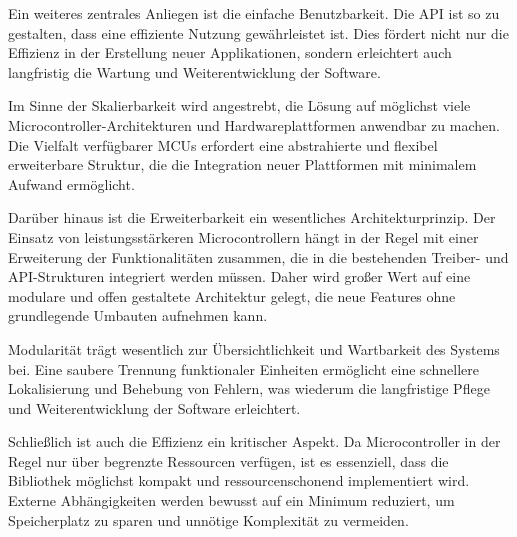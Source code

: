 Ein weiteres zentrales Anliegen ist die einfache Benutzbarkeit. 
Die API ist so zu gestalten, dass eine effiziente Nutzung gewährleistet ist. 
Dies fördert nicht nur die Effizienz in der Erstellung neuer Applikationen, sondern erleichtert auch langfristig die Wartung und Weiterentwicklung der Software.

Im Sinne der Skalierbarkeit wird angestrebt, die Lösung auf möglichst viele Microcontroller-Architekturen und Hardwareplattformen anwendbar zu machen.
Die Vielfalt verfügbarer MCUs erfordert eine abstrahierte und flexibel erweiterbare Struktur, die die Integration neuer Plattformen mit minimalem Aufwand ermöglicht.


Darüber hinaus ist die Erweiterbarkeit ein wesentliches Architekturprinzip.
Der Einsatz von leistungsstärkeren Microcontrollern hängt in der Regel mit einer Erweiterung der Funktionalitäten zusammen, die in die bestehenden Treiber- und API-Strukturen integriert werden müssen.
Daher wird großer Wert auf eine modulare und offen gestaltete Architektur gelegt, die neue Features ohne grundlegende Umbauten aufnehmen kann.

Modularität trägt wesentlich zur Übersichtlichkeit und Wartbarkeit des Systems bei. 
Eine saubere Trennung funktionaler Einheiten ermöglicht eine schnellere Lokalisierung und Behebung von Fehlern, was wiederum die langfristige Pflege und Weiterentwicklung der Software erleichtert.

Schließlich ist auch die Effizienz ein kritischer Aspekt.
Da Microcontroller in der Regel nur über begrenzte Ressourcen verfügen, ist es essenziell, dass die Bibliothek möglichst kompakt und ressourcenschonend implementiert wird. 
Externe Abhängigkeiten werden bewusst auf ein Minimum reduziert, um Speicherplatz zu sparen und unnötige Komplexität zu vermeiden.

